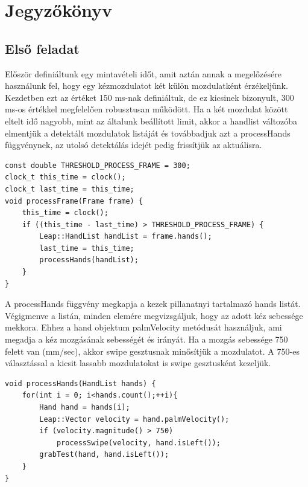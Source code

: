 \chapter{Jegyzőkönyv}
\section{Első feladat}
Először definiáltunk egy mintavételi időt, amit aztán annak a megelőzésére használunk fel, hogy egy kézmozdulatot két külön mozdulatként érzékeljünk. Kezdetben ezt az értéket 150 ms-nak definiáltuk, de ez kicsinek bizonyult,  300 ms-os értékkel megfelelően robusztusan működött. Ha a két mozdulat között eltelt idő nagyobb, mint az általunk beállított limit, akkor a handlist változóba elmentjük a detektált mozdulatok listáját és továbbadjuk azt a processHands függvénynek, az utolsó detektálás idejét pedig frissítjük az aktuálisra.

\begin{lstlisting}
const double THRESHOLD_PROCESS_FRAME = 300;
clock_t this_time = clock();
clock_t last_time = this_time;
void processFrame(Frame frame) {
	this_time = clock();
	if ((this_time - last_time) > THRESHOLD_PROCESS_FRAME) {
		Leap::HandList handList = frame.hands();
		last_time = this_time;
		processHands(handList);
	}
}	
\end{lstlisting}
A processHands függvény megkapja a kezek pillanatnyi tartalmazó hands listát. Végigmenve a listán, minden elemére megvizsgáljuk, hogy az adott kéz sebessége mekkora. Ehhez a hand objektum palmVelocity metódusát használjuk, ami megadja a kéz mozgásának sebességét és irányát. Ha a mozgás sebessége 750 felett van (mm/sec), akkor swipe gesztusnak minősítjük a mozdulatot. A 750-es választással a kicsit lassabb mozdulatokat is swipe gesztusként kezeljük.

\begin{lstlisting}
void processHands(HandList hands) {
	for(int i = 0; i<hands.count();++i){
		Hand hand = hands[i];
		Leap::Vector velocity = hand.palmVelocity();
		if (velocity.magnitude() > 750)
			processSwipe(velocity, hand.isLeft());
		grabTest(hand, hand.isLeft());
	}
}
\end{lstlisting}

